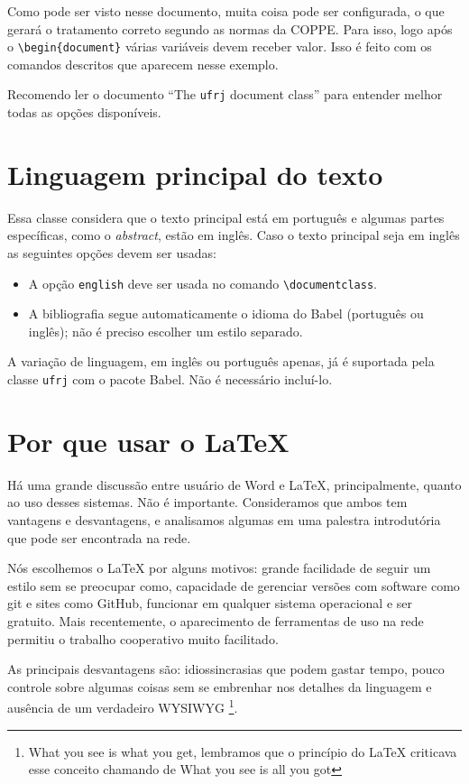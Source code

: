\documentclass[dsc,setavermelha,numeracaoporcapitulo,linhanafolhaderosto]{ufrj}
\theoremstyle{plain}
\theoremstyle{definition}
\theoremstyle{remark}
\begin{document}
   Como pode ser visto nesse documento, muita coisa pode ser configurada, o que gerará o tratamento correto segundo as normas da COPPE. Para isso, logo após o \verb|\begin{document}| várias variáveis devem receber valor. Isso é feito com os comandos descritos que aparecem nesse exemplo.

   Recomendo ler o documento ``The \verb*|ufrj| document class'' para entender melhor todas as opções disponíveis.

\section{Linguagem principal do texto}

  Essa classe considera que o texto principal está em português e algumas partes específicas, como o \textit{abstract}, estão em inglês. Caso o texto principal seja em inglês as seguintes opções devem ser usadas:
 \begin{itemize}
 \item A opção \verb|english| deve ser usada no comando \verb|\documentclass|.
 \item A bibliografia segue automaticamente o idioma do Babel (português ou inglês); não é preciso escolher um estilo separado.
 \end{itemize}

  A variação de linguagem, em inglês ou português apenas, já é suportada pela classe \verb|ufrj| com o pacote Babel. Não é necessário incluí-lo.

\section{Por que usar o \LaTeX}

  Há uma grande discussão entre usuário de Word e \LaTeX, principalmente, quanto ao uso desses sistemas. Não é importante. Consideramos que ambos tem vantagens e desvantagens, e analisamos algumas em uma palestra introdutória que pode ser encontrada na rede.

  Nós escolhemos o \LaTeX{} por alguns motivos: grande facilidade de seguir um estilo sem se preocupar como, capacidade de gerenciar versões com software como git e sites como GitHub, funcionar em qualquer sistema operacional e  ser gratuito. Mais recentemente, o aparecimento de ferramentas de uso na rede permitiu o trabalho cooperativo muito facilitado.

  As principais desvantagens são: idiossincrasias que podem gastar tempo, pouco controle sobre algumas coisas sem se embrenhar nos detalhes da linguagem e ausência de um verdadeiro WYSIWYG \footnote{What you see is what you get, lembramos que o princípio do \LaTeX{} criticava esse conceito chamando de What you see is all you got}.
\end{document}
